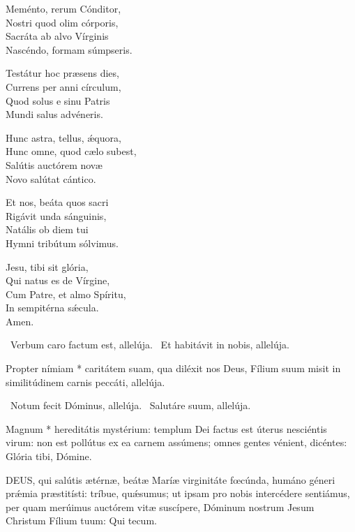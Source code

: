 Meménto, rerum Cónditor,\\
Nostri quod olim córporis,\\
Sacráta ab alvo Vírginis\\
Nascéndo, formam súmpseris.

Testátur hoc præsens dies,\\
Currens per anni círculum,\\
Quod solus e sinu Patris\\
Mundi salus advéneris.

Hunc astra, tellus, ǽquora,\\
Hunc omne, quod cælo subest,\\
Salútis auctórem novæ\\
Novo salútat cántico.

Et nos, beáta quos sacri\\
Rigávit unda sánguinis,\\
Natális ob diem tui\\
Hymni tribútum sólvimus.

Jesu, tibi sit glória,\\
Qui natus es de Vírgine,\\
Cum Patre, et almo Spíritu,\\
In sempitérna sǽcula.\\
Amen.

\V\ Verbum caro factum est, allelúja. \R\ Et habitávit in nobis, allelúja.

 Propter nímiam * caritátem suam, qua diléxit nos Deus, Fílium suum misit in similitúdinem carnis peccáti, allelúja.


\V\ Notum fecit Dóminus, allelúja. \R\ Salutáre suum, allelúja.

 Magnum * hereditátis mystérium: templum Dei factus est úterus nesciéntis virum: non est pollútus ex ea carnem assúmens; omnes gentes vénient, dicéntes: Glória tibi, Dómine.


\lettrine[lines=2]{D}{EUS}, qui salútis ætérnæ, beátæ Maríæ virginitáte fœcúnda, humáno géneri prǽmia præstitísti: tríbue, quǽsumus; ut ipsam pro nobis intercédere sentiámus, per quam merúimus auctórem vitæ suscípere, Dóminum nostrum Jesum Christum Fílium tuum: Qui tecum.


